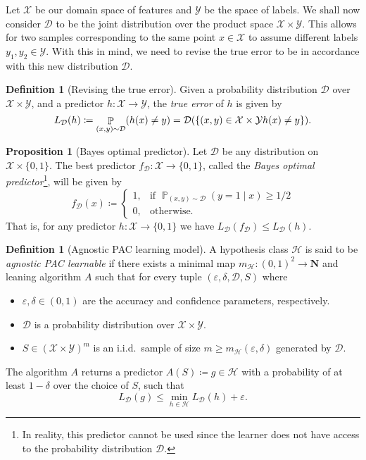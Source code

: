 \documentclass[11pt, reqno]{amsart}
\theoremstyle{definition}
\newtheorem{proposition}[theorem]{Proposition}
\newtheorem{definition}[theorem]{Definition}
\renewcommand{\leq}{\leqslant}
\renewcommand{\geq}{\geqslant}
\let\colon\relax
\newcommand{\N}{\mathbf{N}}
\DeclareMathOperator{\Prob}{\mathbb{P}} %
\begin{document}
Let \(\mathcal{X}\) be our domain space of features and \(\mathcal{Y}\) be the
space of labels. We shall now consider \(\mathcal{D}\) to be the joint
distribution over the product space \(\mathcal{X} \times \mathcal{Y}\). This
allows for two samples corresponding to the same point \(x \in \mathcal{X}\) to
assume different labels \(y_1, y_2 \in \mathcal{Y}\). With this in mind, we need
to revise the true error to be in accordance with this new distribution
\(\mathcal{D}\).

\begin{definition}[Revising the true error]
\label{def:true-error-revised}
Given a probability distribution \(\mathcal{D}\) over \(\mathcal{X} \times
\mathcal{Y}\), and a predictor \(h: \mathcal{X} \to \mathcal{Y}\), the
\emph{true error} of \(h\) is given by
\[
L_{\mathcal{D}}(h) \coloneq \Prob_{(x, y) \sim \mathcal{D}}(h(x) \neq y)
= \mathcal{D}(\{(x, y) \in \mathcal{X} \times \mathcal{Y} \colon h(x) \neq y\}).
\]
\end{definition}

\begin{proposition}[Bayes optimal predictor]
\label{prop:bayes-optimal-predictor}
Let \(\mathcal{D}\) be any distribution on \(\mathcal{X} \times \{0, 1\}\). The
best predictor \(f_{\mathcal{D}}: \mathcal{X} \to \{0, 1\}\), called the
\emph{Bayes optimal predictor}\footnote{In reality, this predictor cannot be
  used since the learner does not have access to the probability distribution
  \(\mathcal{D}\).}, will be given by
\[
f_{\mathcal{D}}(x) \coloneq
\begin{cases}
  1, &\text{if } \Prob_{(x, y) \sim \mathcal{D}}(y = 1 \mid x) \geq 1/2 \\
  0, &\text{otherwise.}
\end{cases}
\]
That is, for any predictor \(h: \mathcal{X} \to \{0, 1\}\) we have
\(L_{\mathcal{D}}(f_{\mathcal{D}}) \leq L_{\mathcal{D}}(h)\).
\end{proposition}

\begin{definition}[Agnostic PAC learning model]
\label{def:agnostic-pac-learning-model}
A hypothesis class \(\mathcal{H}\) is said to be \emph{agnostic PAC learnable}
if there exists a minimal map \(m_{\mathcal{H}}: (0, 1)^2 \to \N\) and leaning
algorithm \(A\) such that for every tuple \((\varepsilon, \delta,
\mathcal{D}, S)\) where
\begin{itemize}\setlength\itemsep{0em}
\item \(\varepsilon, \delta \in (0, 1)\) are the accuracy and confidence
  parameters, respectively.
\item \(\mathcal{D}\) is a probability distribution over
  \(\mathcal{X} \times \mathcal{Y}\).
\item \(S \in (\mathcal{X} \times \mathcal{Y})^m\) is an i.i.d.~sample of size
  \(m \geq m_{\mathcal{H}}(\varepsilon, \delta)\) generated by \(\mathcal{D}\).
\end{itemize}
The algorithm \(A\) returns a predictor \(A(S) \coloneq g \in \mathcal{H}\) with
a probability of at least \(1 - \delta\) over the choice of \(S\), such that
\[
L_{\mathcal{D}}(g) \leq \min_{h \in \mathcal{H}} L_{\mathcal{D}}(h) + \varepsilon.
\]
\end{definition}
\end{document}
